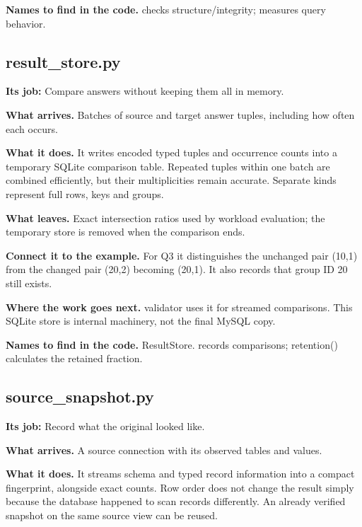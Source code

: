 \textbf{Names to find in the code.}  checks structure/integrity;  measures query behavior.


\subsection{result\_store.py}

\textbf{Its job:} Compare answers without keeping them all in memory.

\textbf{What arrives.} Batches of source and target answer tuples, including how often each occurs.

\textbf{What it does.} It writes encoded typed tuples and occurrence counts into a temporary SQLite comparison table. Repeated tuples within one batch are combined efficiently, but their multiplicities remain accurate. Separate kinds represent full rows, keys and groups.

\textbf{What leaves.} Exact intersection ratios used by workload evaluation; the temporary store is removed when the comparison ends.

\textbf{Connect it to the example.} For Q3 it distinguishes the unchanged pair (10,1) from the changed pair (20,2) becoming (20,1). It also records that group ID 20 still exists.

\textbf{Where the work goes next.} validator uses it for streamed comparisons. This SQLite store is internal machinery, not the final MySQL copy.

\textbf{Names to find in the code.} ResultStore. records comparisons; retention() calculates the retained fraction.


\subsection{source\_snapshot.py}

\textbf{Its job:} Record what the original looked like.

\textbf{What arrives.} A source connection with its observed tables and values.

\textbf{What it does.} It streams schema and typed record information into a compact fingerprint, alongside exact counts. Row order does not change the result simply because the database happened to scan records differently. An already verified snapshot on the same source view can be reused.

